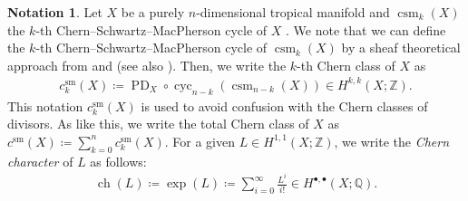 \documentclass[a4paper,dvipdfmx,reqno,12pt]{amsart}
\theoremstyle{definition}
\newtheorem{notation}[theorem]{Notation}
\newcommand{\deq}{\coloneqq}
\newcommand{\opn}[1]{\operatorname{#1}}
\numberwithin{equation}{section}
\begin{document}
\begin{notation}
Let $X$ be a purely $n$-dimensional tropical manifold
and $\opn{csm}_{k}(X)$ the $k$-th
Chern--Schwartz--MacPherson cycle of $X$
\cite[Definition 3.4]{demedrano2023chern}.
We note that we can define
the $k$-th Chern--Schwartz--MacPherson
cycle of $\opn{csm}_{k}(X)$ by a sheaf
theoretical approach  
from \cite[Proposition 3.11 and Lemma 3.12]{demedrano2023chern}
and \cite[Lemma 4.13]{MR4637248}
(see also \cite[Lemma 5.4]{shaw2022birational}).
Then, we write the $k$-th Chern class of $X$ as
\begin{align}
c_{k}^{\mathrm{sm}}(X)\deq
\opn{PD}_X\circ \opn{cyc}_{n-k}(\opn{csm}_{n-k}(X))
\in H^{k,k}(X;\mathbb{Z}).
\end{align}
This notation $c_{k}^{\mathrm{sm}}(X)$
is used to avoid confusion with the Chern classes of divisors.
As like this, we write the total Chern class of $X$ as
$c^{\mathrm{sm}}(X)\deq\sum_{k=0}^{n} c_{k}^{\mathrm{sm}}(X)$.
For a given $L\in H^{1,1}(X;\mathbb{Z})$, we write
the \emph{Chern character} of $L$ as follows:
\begin{align}
\opn{ch}(L)\deq \opn{exp}(L)
\deq \sum_{i=0}^{\infty}\frac{L^{i}}{i!}\in 
H^{\bullet,\bullet}(X;\mathbb{ Q}).
\end{align}
\end{notation}
\end{document}
